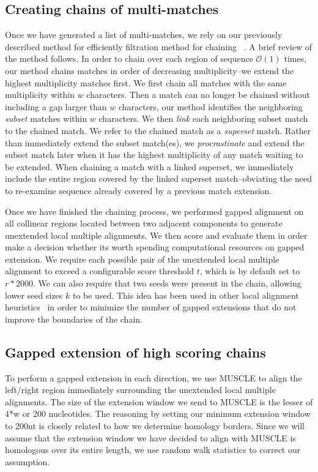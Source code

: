 \documentclass[twoside,11pt]{article}
\begin{document}
\subsection{Creating chains of multi-matches}

Once we have generated a list of multi-matches, we rely on our previously described method for efficiently filtration method for chaining ~\cite{ref-procrast}. A brief review of the method follows. In order to chain over each region of sequence $\mathcal{O}(1)$ times,
our method chains matches in order of decreasing multiplicity--we
extend the highest multiplicity matches first. We first chain all matches
with the same multiplicity within $w$
characters. Then a match can no
longer be chained without including a gap larger than $w$
characters, our method identifies the neighboring \textit{subset}
matches within $w$ characters. We then \textit{link} each
neighboring subset match to the chained match. We refer to the
chained match as a \textit{superset} match. Rather than immediately
extend the subset match(es), we \textit{procrastinate} and extend
the subset match later when it has the highest multiplicity of any
match waiting to be extended. When chaining a match with a linked
superset, we immediately include the entire region covered by the linked superset
match--obviating the need to re-examine sequence already covered by
a previous match extension.

Once we have finished the chaining process, we performed gapped alignment on all collinear regions located between two adjacent components to generate unextended local multiple alignments. We then score and evaluate them in order make a decision whether its worth spending computational resources on gapped extension. We require each possible pair of the unextended local multiple alignment to exceed a configurable score threshold $t$, which is by default set to $r*2000$. We can also require that two seeds were present in the chain, allowing lower seed sizes $k$ to be used. This idea has been used in other local alignment heuristics~\cite{ref-blastz,ref-gappedblast,ref-blat} in order to minimize the number of gapped extensions that do not improve the boundaries of the chain.

\subsection{Gapped extension of high scoring chains}

To perform a gapped extension in each direction, we use MUSCLE to align the left/right region immediately surrounding the unextended local multiple alignments. The size of the extension window we send to MUSCLE is the lesser of 4*w or 200 nucleotides. The reasoning by setting our minimum extension window to 200nt is closely related to how we determine homology borders. Since we will assume that the extension window we have decided to align with MUSCLE is homologous over its entire length, we use random walk statistics to correct our assumption.
\end{document}
